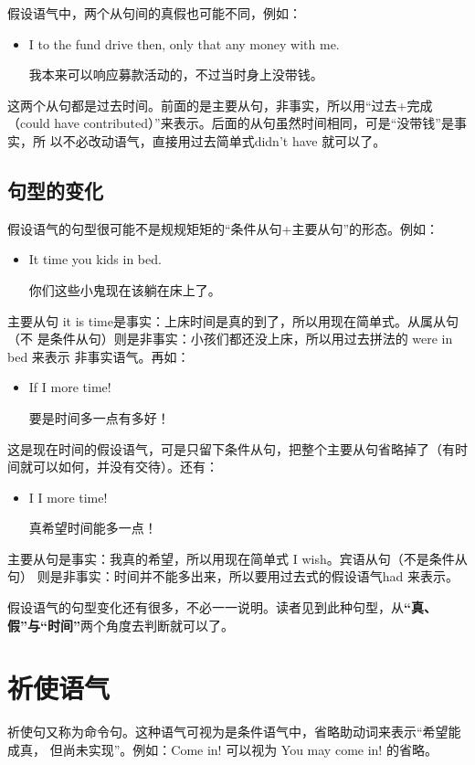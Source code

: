 假设语气中，两个从句间的真假也可能不同，例如：
\begin{itemize}
\item I  to the fund drive then, only that  any money with me.

  我本来可以响应募款活动的，不过当时身上没带钱。
\end{itemize}
这两个从句都是过去时间。前面的是主要从句，非事实，所以用“过去+完成（could
have contributed）”来表示。后面的从句虽然时间相同，可是“没带钱”是事实，所
以不必改动语气，直接用过去简单式didn't have 就可以了。

\subsection{句型的变化}

假设语气的句型很可能不是规规矩矩的“条件从句+主要从句”的形态。例如：
\begin{itemize}
\item  It time you kids  in bed.

  你们这些小鬼现在该躺在床上了。
\end{itemize}
主要从句 it is time是事实：上床时间是真的到了，所以用现在简单式。从属从句（不
是条件从句）则是非事实：小孩们都还没上床，所以用过去拼法的 were in bed 来表示
非事实语气。再如：
\begin{itemize}
\item  If  I  more time!

  要是时间多一点有多好！
\end{itemize}
这是现在时间的假设语气，可是只留下条件从句，把整个主要从句省略掉了（有时间就可以如何，并没有交待）。还有：
\begin{itemize}
\item  I  I  more time!

  真希望时间能多一点！
\end{itemize}
主要从句是事实：我真的希望，所以用现在简单式 I wish。宾语从句（不是条件从句）
则是非事实：时间并不能多出来，所以要用过去式的假设语气had 来表示。

假设语气的句型变化还有很多，不必一一说明。读者见到此种句型，从\textbf{“真、
  假”与“时间”}两个角度去判断就可以了。

\section{祈使语气}

祈使句又称为命令句。这种语气可视为是条件语气中，省略助动词来表示“希望能成真，
但尚未实现”。例如：Come in! 可以视为 You may come in! 的省略。


